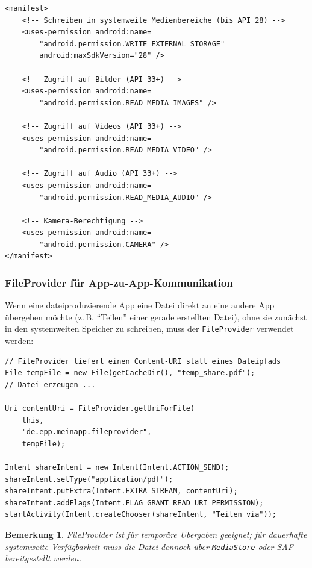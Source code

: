 ﻿\documentclass[12pt, a4paper]{article}
\newtheorem{bemerkung}[definition]{Bemerkung}
\begin{document}
\begin{lstlisting}[style=xml, caption={AndroidManifest.xml: Korrekte Berechtigungen fuer Medienzugriff}]
<manifest>
    <!-- Schreiben in systemweite Medienbereiche (bis API 28) -->
    <uses-permission android:name=
        "android.permission.WRITE_EXTERNAL_STORAGE"
        android:maxSdkVersion="28" />
    
    <!-- Zugriff auf Bilder (API 33+) -->
    <uses-permission android:name=
        "android.permission.READ_MEDIA_IMAGES" />
    
    <!-- Zugriff auf Videos (API 33+) -->
    <uses-permission android:name=
        "android.permission.READ_MEDIA_VIDEO" />
    
    <!-- Zugriff auf Audio (API 33+) -->
    <uses-permission android:name=
        "android.permission.READ_MEDIA_AUDIO" />
    
    <!-- Kamera-Berechtigung -->
    <uses-permission android:name=
        "android.permission.CAMERA" />
</manifest>
\end{lstlisting}

\subsubsection{FileProvider für App-zu-App-Kommunikation}

Wenn eine dateiproduzierende App eine Datei direkt an eine andere App übergeben
möchte (z.\,B. \enquote{Teilen} einer gerade erstellten Datei), ohne sie zunächst
in den systemweiten Speicher zu schreiben, muss der \texttt{FileProvider}
verwendet werden:

\begin{lstlisting}[style=android, caption={FileProvider fuer temporaere Dateiuebergabe}]
// FileProvider liefert einen Content-URI statt eines Dateipfads
File tempFile = new File(getCacheDir(), "temp_share.pdf");
// Datei erzeugen ...

Uri contentUri = FileProvider.getUriForFile(
    this,
    "de.epp.meinapp.fileprovider",
    tempFile);

Intent shareIntent = new Intent(Intent.ACTION_SEND);
shareIntent.setType("application/pdf");
shareIntent.putExtra(Intent.EXTRA_STREAM, contentUri);
shareIntent.addFlags(Intent.FLAG_GRANT_READ_URI_PERMISSION);
startActivity(Intent.createChooser(shareIntent, "Teilen via"));
\end{lstlisting}

\begin{bemerkung}
FileProvider ist für \emph{temporäre} Übergaben geeignet; für dauerhafte
systemweite Verfügbarkeit muss die Datei dennoch über \texttt{MediaStore}
oder SAF bereitgestellt werden.
\end{bemerkung}
\end{document}
